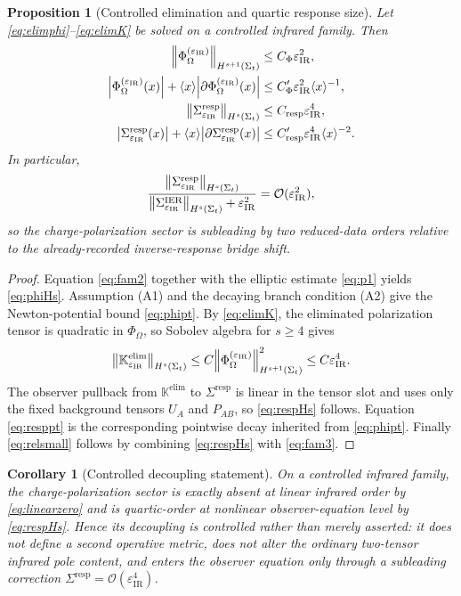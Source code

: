 \documentclass[11pt]{article}
\newcommand{\ProjSub}{P}
\newcommand{\BaseShift}{\Sigma^{\mathrm{IER}}}
\newcommand{\ResponseShift}{\Sigma^{\mathrm{resp}}}
\newcommand{\AuxPol}{\mathbb K}
\newcommand{\FlowPot}{\Phi_\Omega}
\newcommand{\Weight}[1]{\langle #1 \rangle}
\newcommand{\IRsmall}{\varepsilon_{\mathrm{IR}}}
\newtheorem{proposition}{Proposition}
\newtheorem{corollary}{Corollary}
\begin{document}
\begin{proposition}[Controlled elimination and quartic response size]
\label{prop:decouple}
Let \eqref{eq:elimphi}--\eqref{eq:elimK} be solved on a controlled infrared family. Then
\begin{align}
\norm{\FlowPot^{(\IRsmall)}}_{H^{s+1}(\Sigma_t)}
&\le
C_\Phi \IRsmall^2,
\label{eq:phiHs}
\\
\abs{\FlowPot^{(\IRsmall)}(x)}
+\Weight{x}\abs{\partial \FlowPot^{(\IRsmall)}(x)}
&\le
C_\Phi' \IRsmall^2\Weight{x}^{-1},
\label{eq:phipt}
\\
\norm{\ResponseShift_{\IRsmall}}_{H^s(\Sigma_t)}
&\le
C_{\mathrm{resp}}\IRsmall^4,
\label{eq:respHs}
\\
\abs{\ResponseShift_{\IRsmall}(x)}
+\Weight{x}\abs{\partial\ResponseShift_{\IRsmall}(x)}
&\le
C_{\mathrm{resp}}' \IRsmall^4\Weight{x}^{-2}.
\label{eq:resppt}
\end{align}
In particular,
\begin{equation}
\frac{
\norm{\ResponseShift_{\IRsmall}}_{H^s(\Sigma_t)}
}{
\norm{\BaseShift_{\IRsmall}}_{H^s(\Sigma_t)}+ \IRsmall^2
}
=
\mathcal O(\IRsmall^2),
\label{eq:relsmall}
\end{equation}
so the charge-polarization sector is subleading by two reduced-data orders relative to the already-recorded inverse-response bridge shift.
\end{proposition}

\begin{proof}
Equation \eqref{eq:fam2} together with the elliptic estimate \eqref{eq:p1} yields \eqref{eq:phiHs}. Assumption (A1) and the decaying branch condition (A2) give the Newton-potential bound \eqref{eq:phipt}. By \eqref{eq:elimK}, the eliminated polarization tensor is quadratic in \(\FlowPot\), so Sobolev algebra for \(s\ge4\) gives
\[
\norm{\AuxPol^{\mathrm{elim}}_{\IRsmall}}_{H^s(\Sigma_t)}
\le
C
\norm{\FlowPot^{(\IRsmall)}}_{H^{s+1}(\Sigma_t)}^2
\le
C\IRsmall^4.
\]
The observer pullback from \(\AuxPol^{\mathrm{elim}}\) to \(\ResponseShift\) is linear in the tensor slot and uses only the fixed background tensors \(U_A\) and \(\ProjSub_{AB}\), so \eqref{eq:respHs} follows. Equation \eqref{eq:resppt} is the corresponding pointwise decay inherited from \eqref{eq:phipt}. Finally \eqref{eq:relsmall} follows by combining \eqref{eq:respHs} with \eqref{eq:fam3}.
\end{proof}

\begin{corollary}[Controlled decoupling statement]
\label{cor:controlled}
On a controlled infrared family, the charge-polarization sector is exactly absent at linear infrared order by \eqref{eq:linearzero} and is quartic-order at nonlinear observer-equation level by \eqref{eq:respHs}. Hence its decoupling is controlled rather than merely asserted: it does not define a second operative metric, does not alter the ordinary two-tensor infrared pole content, and enters the observer equation only through a subleading correction \(\ResponseShift=\mathcal O(\IRsmall^4)\).
\end{corollary}
\end{document}

